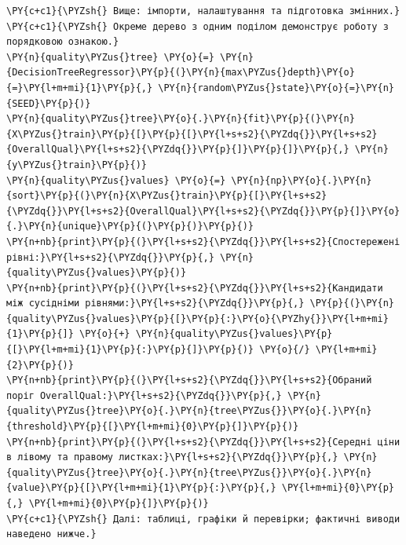 \begin{Verbatim}[commandchars=\\\{\}]
\PY{c+c1}{\PYZsh{} Вище: імпорти, налаштування та підготовка змінних.}
\PY{c+c1}{\PYZsh{} Окреме дерево з одним поділом демонструє роботу з порядковою ознакою.}
\PY{n}{quality\PYZus{}tree} \PY{o}{=} \PY{n}{DecisionTreeRegressor}\PY{p}{(}\PY{n}{max\PYZus{}depth}\PY{o}{=}\PY{l+m+mi}{1}\PY{p}{,} \PY{n}{random\PYZus{}state}\PY{o}{=}\PY{n}{SEED}\PY{p}{)}
\PY{n}{quality\PYZus{}tree}\PY{o}{.}\PY{n}{fit}\PY{p}{(}\PY{n}{X\PYZus{}train}\PY{p}{[}\PY{p}{[}\PY{l+s+s2}{\PYZdq{}}\PY{l+s+s2}{OverallQual}\PY{l+s+s2}{\PYZdq{}}\PY{p}{]}\PY{p}{]}\PY{p}{,} \PY{n}{y\PYZus{}train}\PY{p}{)}
\PY{n}{quality\PYZus{}values} \PY{o}{=} \PY{n}{np}\PY{o}{.}\PY{n}{sort}\PY{p}{(}\PY{n}{X\PYZus{}train}\PY{p}{[}\PY{l+s+s2}{\PYZdq{}}\PY{l+s+s2}{OverallQual}\PY{l+s+s2}{\PYZdq{}}\PY{p}{]}\PY{o}{.}\PY{n}{unique}\PY{p}{(}\PY{p}{)}\PY{p}{)}
\PY{n+nb}{print}\PY{p}{(}\PY{l+s+s2}{\PYZdq{}}\PY{l+s+s2}{Спостережені рівні:}\PY{l+s+s2}{\PYZdq{}}\PY{p}{,} \PY{n}{quality\PYZus{}values}\PY{p}{)}
\PY{n+nb}{print}\PY{p}{(}\PY{l+s+s2}{\PYZdq{}}\PY{l+s+s2}{Кандидати між сусідніми рівнями:}\PY{l+s+s2}{\PYZdq{}}\PY{p}{,} \PY{p}{(}\PY{n}{quality\PYZus{}values}\PY{p}{[}\PY{p}{:}\PY{o}{\PYZhy{}}\PY{l+m+mi}{1}\PY{p}{]} \PY{o}{+} \PY{n}{quality\PYZus{}values}\PY{p}{[}\PY{l+m+mi}{1}\PY{p}{:}\PY{p}{]}\PY{p}{)} \PY{o}{/} \PY{l+m+mi}{2}\PY{p}{)}
\PY{n+nb}{print}\PY{p}{(}\PY{l+s+s2}{\PYZdq{}}\PY{l+s+s2}{Обраний поріг OverallQual:}\PY{l+s+s2}{\PYZdq{}}\PY{p}{,} \PY{n}{quality\PYZus{}tree}\PY{o}{.}\PY{n}{tree\PYZus{}}\PY{o}{.}\PY{n}{threshold}\PY{p}{[}\PY{l+m+mi}{0}\PY{p}{]}\PY{p}{)}
\PY{n+nb}{print}\PY{p}{(}\PY{l+s+s2}{\PYZdq{}}\PY{l+s+s2}{Середні ціни в лівому та правому листках:}\PY{l+s+s2}{\PYZdq{}}\PY{p}{,} \PY{n}{quality\PYZus{}tree}\PY{o}{.}\PY{n}{tree\PYZus{}}\PY{o}{.}\PY{n}{value}\PY{p}{[}\PY{l+m+mi}{1}\PY{p}{:}\PY{p}{,} \PY{l+m+mi}{0}\PY{p}{,} \PY{l+m+mi}{0}\PY{p}{]}\PY{p}{)}
\PY{c+c1}{\PYZsh{} Далі: таблиці, графіки й перевірки; фактичні виводи наведено нижче.}
\end{Verbatim}
